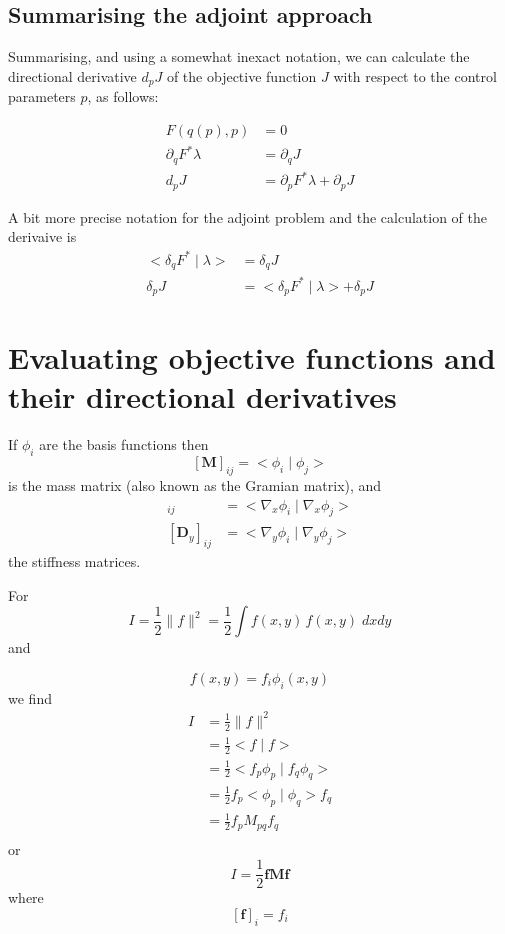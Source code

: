 \documentclass[10pt,a4paper]{book}
\newcommand{\p}{\partial}
\begin{document}
\subsection{Summarising the adjoint approach}
\label{sec:adjointsum}
Summarising, and using a somewhat inexact notation, we can calculate
the directional derivative $d_p J$ of the objective function $J$ with respect
to the control parameters $p$, as follows:

\begin{align}
  F(q(p),p)&=0 \\
  \p_q F^{*} \lambda & = \p_q J \\
  d_p J &= \p_p F^{*} \lambda + \p_p J
\end{align}

A bit more precise notation for the adjoint problem and the calculation of the derivaive is
\begin{align}
  <\delta_q F^{*} \mid \lambda > & = \delta_q J \\
  \delta_p J &= < \delta_p F^{*} \mid \lambda > + \delta_p J
\end{align}



\section{Evaluating objective functions and their directional derivatives}
\label{sec:gradev}
If $\phi_i$ are the basis functions then
\[
[\bm{M}]_{ij}=<\phi_i\mid \phi_j>
\]
is the mass matrix (also known as the Gramian matrix), and
\begin{align*}
[\bm{D}_x]_{ij} & =< \nabla_x \phi_i\mid \nabla_x \phi_j>\\
[\bm{D}_y]_{ij} & =< \nabla_y \phi_i\mid \nabla_y \phi_j>
\end{align*}
the stiffness matrices.

For 
\begin{equation}
I = \frac{1}{2} \| f \|^2 = \frac{1}{2} \int f(x,y) \, f(x,y)\; dx dy
\label{eq:I1}
\end{equation}
 and

\[
f(x,y)=f_i \phi_i(x,y)
\]
we find
\begin{align*}
I &= \frac{1}{2} \| f \|^2 \\
  &=  \frac{1}{2} < f\mid f> \\
  &= \frac{1}{2} < f_p \phi_p\mid f_q \phi_q>\\
  &= \frac{1}{2} f_p <  \phi_p\mid \phi_q> f_q\\
  &= \frac{1}{2} f_p M_{pq} f_q\\
\end{align*}
or
\[
I = \frac{1}{2} \bm{f} \bm{M} \bm{f}
\]
where
\[
[\bm{f}]_i =f_i 
\]
\end{document}

